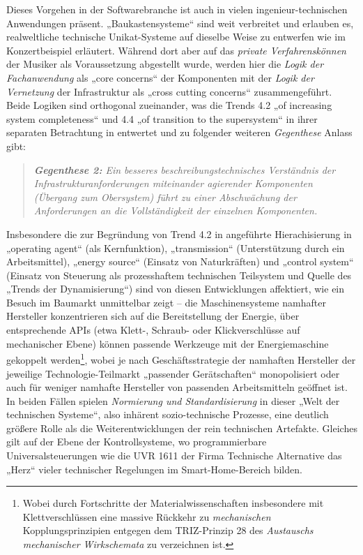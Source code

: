 \documentclass[11pt,a4paper]{article}
\begin{document}
Dieses Vorgehen in der Softwarebranche ist auch in vielen
ingenieur-technischen Anwendungen präsent. „Baukastensysteme“ sind weit
verbreitet und erlauben es, realweltliche technische Unikat-Systeme auf
dieselbe Weise zu entwerfen wie im Konzertbeispiel erläutert. Während dort
aber auf das \emph{private Verfahrenskönnen} der Musiker als Voraussetzung
abgestellt wurde, werden hier die \emph{Logik der Fachanwendung} als „core
concerns“ der Komponenten mit der \emph{Logik der Vernetzung} der
Infrastruktur als „cross cutting concerns“ zusammengeführt. Beide Logiken sind
orthogonal zueinander, was die Trends 4.2 „of increasing system completeness“
und 4.4 „of transition to the supersystem“ in ihrer separaten Betrachtung in
\cite{TESE2018} entwertet und zu folgender weiteren \emph{Gegenthese} Anlass
gibt:
\begin{quote}\it 
  \textbf{Gegenthese 2:} Ein besseres beschreibungstechnisches Verständnis der
  Infrastrukturanforderungen miteinander agierender Komponenten (Übergang zum
  Obersystem) führt zu einer \emph{Abschwächung} der Anforderungen an die
  Vollständigkeit der einzelnen Komponenten.
\end{quote}
Insbesondere die zur Begründung von Trend 4.2 in \cite{TESE2018} angeführte
Hierachisierung in „operating agent“ (als Kernfunktion), „transmission“
(Unterstützung durch ein Arbeitsmittel), „energy source“ (Einsatz von
Naturkräften) und „control system“ (Einsatz von Steuerung als prozesshaftem
technischen Teilsystem und Quelle des „Trends der Dynamisierung“) sind von
diesen Entwicklungen affektiert, wie ein Besuch im Baumarkt unmittelbar zeigt
-- die Maschinensysteme namhafter Hersteller konzentrieren sich auf die
Bereitstellung der Energie, über entsprechende APIs (etwa Klett-, Schraub-
oder Klickverschlüsse auf mechanischer Ebene) können passende Werkzeuge mit
der Energiemaschine gekoppelt werden\footnote{Wobei durch Fortschritte der
  Materialwissenschaften insbesondere mit Klettverschlüssen eine massive
  Rückkehr zu \emph{mechanischen} Kopplungsprinzipien entgegen dem
  TRIZ-Prinzip 28 des \emph{Austauschs mechanischer Wirkschemata} zu
  verzeichnen ist.}, wobei je nach Geschäftsstrategie der namhaften Hersteller
der jeweilige Technologie-Teilmarkt „passender Gerätschaften“ monopolisiert
oder auch für weniger namhafte Hersteller von passenden Arbeitsmitteln
geöffnet ist. In beiden Fällen spielen \emph{Normierung und Standardisierung}
in dieser „Welt der technischen Systeme“, also inhärent sozio-technische
Prozesse, eine deutlich größere Rolle als die Weiterentwicklungen der rein
technischen Artefakte. Gleiches gilt auf der Ebene der Kontrollsysteme, wo
programmierbare Universalsteuerungen wie die UVR 1611 der Firma Technische
Alternative das „Herz“ vieler technischer Regelungen im Smart-Home-Bereich
bilden.
\end{document}
